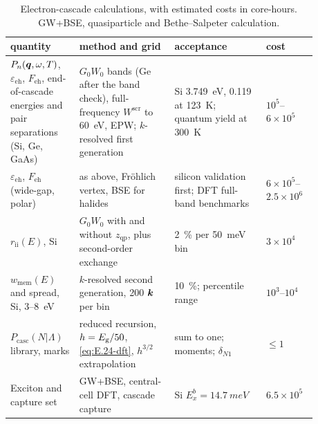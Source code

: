 \begin{table}[t]
  \caption{Electron-cascade calculations, with estimated costs in core-hours. GW+BSE, quasiparticle and Bethe--Salpeter calculation.}
  \label{tab:E24-summary}
  \centering
  \small
  \begin{tabular}{p{0.19\linewidth}p{0.29\linewidth}p{0.27\linewidth}p{0.13\linewidth}}
    \toprule
    quantity & method and grid & acceptance & cost \\
    \midrule
    $P_n(\bm{q}, \omega, T)$, $\varepsilon_{\mathrm{eh}}$, $F_{\mathrm{eh}}$, end-of-cascade energies and pair separations (Si, Ge, GaAs) & $G_0W_0$ bands (Ge after the band check), full-frequency $W^{\mathrm{scr}}$ to \SI{60}{eV}, EPW; $k$-resolved first generation & Si \SI{3.749}{eV}, 0.119 at \SI{123}{K}; quantum yield at \SI{300}{K} & $10^5$--$6\times10^5$ \\
    $\varepsilon_{\mathrm{eh}}$, $F_{\mathrm{eh}}$ (wide-gap, polar) & as above, Fr\"ohlich vertex, BSE for halides & silicon validation first; DFT full-band benchmarks & $6\times10^5$--$2.5\times10^6$ \\
    $r_{\mathrm{ii}}(E)$, Si & $G_0W_0$ with and without $z_{\mathrm{qp}}$, plus second-order exchange & \SI{2}{\percent} per \SI{50}{meV} bin & $3\times10^4$ \\
    $w_{\mathrm{mem}}(E)$ and spread, Si, 3--\SI{8}{eV} & $k$-resolved second generation, 200 $\bm{k}$ per bin & \SI{10}{\percent}; percentile range & $10^3$--$10^4$ \\
    $P_{\mathrm{casc}}(N|\Lambda)$ library, marks & reduced recursion, $h = E_{\mathrm{g}}/50$, \cref{eq:E.24-dft}, $h^{3/2}$ extrapolation & sum to one; moments; $\delta_{N1}$ & $\le 1$ \\
    Exciton and capture set & GW+BSE, central-cell DFT, cascade capture & Si $E_x^b = \SI{14.7}{meV}$ & $6.5\times10^5$ \\
    \bottomrule
  \end{tabular}
\end{table}
